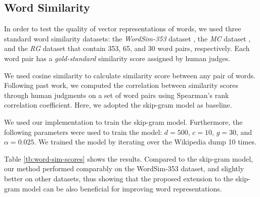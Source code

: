 \documentclass[11pt,letterpaper]{article}
\begin{document}
\subsection{Word Similarity}

In order to test the quality of vector representations of words, we used three standard word similarity datasets: the \textit{WordSim-353} dataset \cite{Finkelstein2002}, the \textit{MC} dataset \cite{Miller1991}, and the \textit{RG} dataset \cite{Rubenstein1965} that contain 353, 65, and 30 word pairs, respectively.
Each word pair has a \textit{gold-standard} similarity score assigned by human judges.

We used cosine similarity to calculate similarity score between any pair of words.
Following past work, we computed the correlation between similarity scores through human judgments on a set of word pairs using Spearman's rank correlation coefficient.
Here, we adopted the skip-gram model as baseline.

We used our implementation to train the skip-gram model.
Furthermore, the following parameters were used to train the model: $d = 500$, $c = 10$, $g = 30$, and $\alpha = 0.025$.
We trained the model by iterating over the Wikipedia dump 10 times.

Table \ref{tb:word-sim-scores} shows the results.
Compared to the skip-gram model, our method performed comparably on the WordSim-353 dataset, and slightly better on other datasets, thus showing that the proposed extension to the skip-gram model can be also beneficial for improving word representations.
\end{document}
